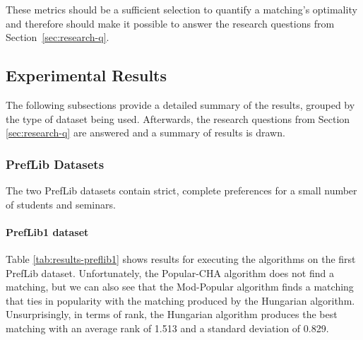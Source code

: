 These metrics should be a sufficient selection to quantify a matching's optimality and therefore should make it possible to answer the research questions from \mbox{Section \ref{sec:research-q}.}

\subsection{Experimental Results}
The following subsections provide a detailed summary of the results, grouped by the type of dataset being used. Afterwards, the research questions from Section \ref{sec:research-q} are answered and a summary of results is drawn.

\subsubsection{PrefLib Datasets}
The two PrefLib datasets contain strict, complete preferences for a small number of students and seminars.

\paragraph{PrefLib1 dataset}
Table \ref{tab:results-preflib1} shows results for executing the algorithms on the first PrefLib dataset. Unfortunately, the Popular-CHA algorithm does not find a matching, but we can also see that the Mod-Popular algorithm finds a matching that ties in popularity with the matching produced by the Hungarian algorithm. Unsurprisingly, in terms of rank, the Hungarian algorithm produces the best matching with an average rank of 1.513 and a standard deviation of 0.829.

\begin{table}[h!]
  \centering
  \caption{Summary of the results for PrefLib1}
  \label{tab:results-preflib1}
\end{table}

